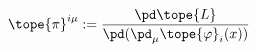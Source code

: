 \begin{equation}	\label{12.127}
\tope{\pi}^{i\mu} := \frac{\pd\tope{L}}{\pd(\pd_\mu\tope{\varphi}_i(x))}
	\end{equation}

